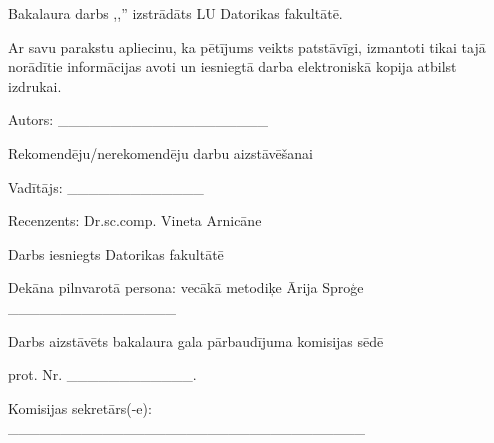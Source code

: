 \newcommand{\makedocpagee}{
		\thispagestyle{empty} 
		Bakalaura darbs ,,\@nosaukums''
		izstrādāts LU Datorikas fakultātē.
		\vspace{3cm} 
		
		Ar savu parakstu apliecinu, ka pētījums veikts patstāvīgi, 
		izmantoti tikai tajā norādītie informācijas avoti un iesniegtā darba elektroniskā kopija atbilst izdrukai.

		Autors: \_\_\_\_\_\_\_\_\_\_\_\_\_\_\_\_\_\_\_\_
		{\@autors}
		\vspace{3cm} 
		
		Rekomendēju/nerekomendēju darbu aizstāvēšanai

		Vadītājs: {\@vaditajs} 
		\_\_\_\_\_\_\_\_\_\_\_\_\_ {\@datums}
		
		\vspace{3cm} 
		{\raggedright
		Recenzents: Dr.sc.comp. Vineta Arnicāne}

		\vspace{3cm}
		Darbs iesniegts Datorikas fakultātē  {\@datums}

		Dekāna pilnvarotā persona: vecākā metodiķe Ārija Sproģe \_\_\_\_\_\_\_\_\_\_\_\_\_\_\_\_
		\vspace{3cm} 
		
		Darbs aizstāvēts bakalaura gala pārbaudījuma komisijas sēdē

		{\@datums} prot. Nr.
		\_\_\_\_\_\_\_\_\_\_\_\_.

		Komisijas sekretārs(-e):  \_\_\_\_\_\_\_\_\_\_\_\_\_\_\_\_\_\_\_\_\_\_\_\_\_\_\_\_\_\_\_\_\_\_
}
\makedocpagee

